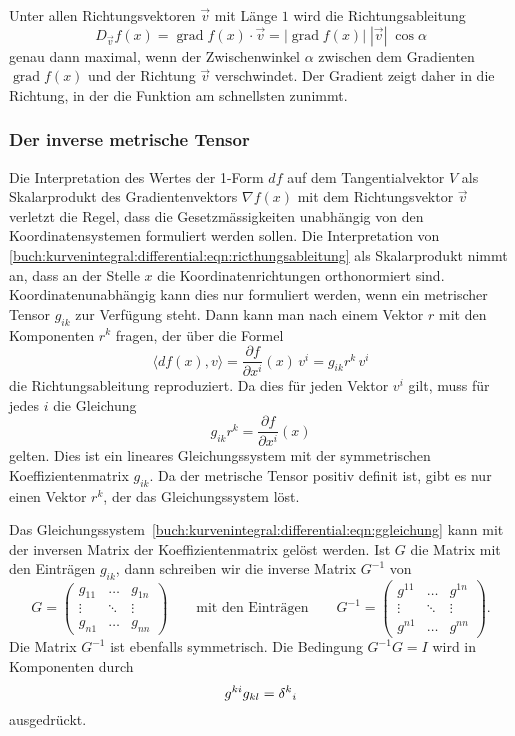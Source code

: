 Unter allen Richtungsvektoren $\vec{v}$ mit Länge $1$ wird die
Richtungsableitung
\[
D_{\vec{v}}f(x)
=
\operatorname{grad}f(x)\cdot \vec{v}
=
|\operatorname{grad}f(x)|\;|\vec{v}|\;\cos\alpha
\]
genau dann maximal, wenn der Zwischenwinkel $\alpha$ zwischen
dem Gradienten $\operatorname{grad}f(x)$ und der Richtung $\vec{v}$
verschwindet.
Der Gradient zeigt daher in die Richtung, in der die Funktion am
schnellsten zunimmt.

%
%
\subsubsection{Der inverse metrische Tensor}
Die Interpretation des Wertes der 1-Form $df$ auf dem Tangentialvektor $V$ 
als Skalarprodukt des Gradientenvektors $\nabla f(x)$ mit dem
Richtungsvektor $\vec{v}$ verletzt die Regel, dass die Gesetzmässigkeiten
unabhängig von den Koordinatensystemen formuliert werden sollen.
Die Interpretation von
\eqref{buch:kurvenintegral:differential:eqn:ricthungsableitung}
als Skalarprodukt nimmt an, dass an der Stelle $x$ die Koordinatenrichtungen
orthonormiert sind.
Koordinatenunabhängig kann dies nur formuliert werden, wenn ein metrischer
Tensor $g_{ik}$ zur Verfügung steht.
Dann kann man nach einem Vektor $r$ mit den Komponenten $r^k$ fragen,
der über die Formel
\[
\langle df(x),v\rangle
=
\frac{\partial f}{\partial x^i}(x)\,v^i
=
g_{ik} r^k\,v^i
\]
die Richtungsableitung reproduziert.
Da dies für jeden Vektor $v^i$ gilt, muss für jedes $i$ die Gleichung
\begin{equation}
g_{ik}r^k = \frac{\partial f}{\partial x^i}(x)
\label{buch:kurvenintegral:differential:eqn:ggleichung}
\end{equation}
gelten.
Dies ist ein lineares Gleichungssystem mit der symmetrischen
Koeffizientenmatrix $g_{ik}$.
Da der metrische Tensor positiv definit ist, gibt es nur einen
Vektor $r^k$, der das Gleichungssystem löst.

Das Gleichungssystem~\eqref{buch:kurvenintegral:differential:eqn:ggleichung}
kann mit der inversen Matrix der Koeffizientenmatrix gelöst
werden.
Ist $G$ die Matrix mit den Einträgen $g_{ik}$, dann schreiben wir
die inverse Matrix $G^{-1}$ von
\[
G
=
\begin{pmatrix}
g_{11}&\dots &g_{1n}\\
\vdots&\ddots&\vdots\\
g_{n1}&\dots &g_{nn}
\end{pmatrix}
\qquad
\text{mit den Einträgen}
\qquad
G^{-1}
= 
\begin{pmatrix}
g^{11}&\dots &g^{1n}\\
\vdots&\ddots&\vdots\\
g^{n1}&\dots &g^{nn}
\end{pmatrix}.
\]
Die Matrix $G^{-1}$ ist ebenfalls symmetrisch.
Die Bedingung $G^{-1}G=I$ wird in Komponenten durch
\[
g^{ki}g_{kl}
=
\delta^k\mathstrut_i
\]
ausgedrückt.

